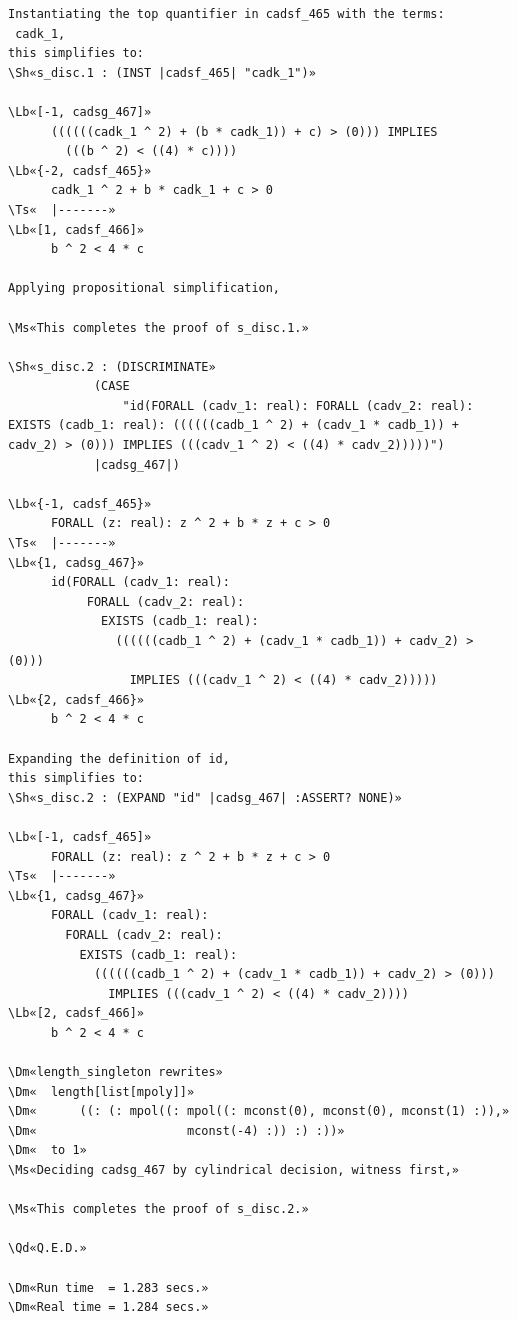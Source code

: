 \documentclass[11pt]{article}
\newcommand\Ms[1]{\textcolor{moss}{\textbf{#1}}}
\newcommand\Qd[1]{\colorbox{mosssoft}{\textcolor{moss}{\textbf{#1}}}}
\newcommand\Dm[1]{\textcolor{muted}{#1}}
\newcommand\Lb[1]{\textcolor{muted}{#1}}
\newcommand\Ts[1]{\textcolor{muted}{#1}}
\newcommand\Sh[1]{\textcolor{accent}{#1}}
\begin{document}
\begin{termbox}
\begin{Verbatim}[commandchars=\\«»]
Instantiating the top quantifier in cadsf_465 with the terms:
 cadk_1,
this simplifies to:
\Sh«s_disc.1 : (INST |cadsf_465| "cadk_1")»

\Lb«[-1, cadsg_467]»
      ((((((cadk_1 ^ 2) + (b * cadk_1)) + c) > (0))) IMPLIES
        (((b ^ 2) < ((4) * c))))
\Lb«{-2, cadsf_465}»
      cadk_1 ^ 2 + b * cadk_1 + c > 0
\Ts«  |-------»
\Lb«[1, cadsf_466]»
      b ^ 2 < 4 * c

Applying propositional simplification,

\Ms«This completes the proof of s_disc.1.»

\Sh«s_disc.2 : (DISCRIMINATE»
            (CASE
                "id(FORALL (cadv_1: real): FORALL (cadv_2: real): EXISTS (cadb_1: real): ((((((cadb_1 ^ 2) + (cadv_1 * cadb_1)) + cadv_2) > (0))) IMPLIES (((cadv_1 ^ 2) < ((4) * cadv_2)))))")
            |cadsg_467|)

\Lb«{-1, cadsf_465}»
      FORALL (z: real): z ^ 2 + b * z + c > 0
\Ts«  |-------»
\Lb«{1, cadsg_467}»
      id(FORALL (cadv_1: real):
           FORALL (cadv_2: real):
             EXISTS (cadb_1: real):
               ((((((cadb_1 ^ 2) + (cadv_1 * cadb_1)) + cadv_2) > (0)))
                 IMPLIES (((cadv_1 ^ 2) < ((4) * cadv_2)))))
\Lb«{2, cadsf_466}»
      b ^ 2 < 4 * c

Expanding the definition of id,
this simplifies to:
\Sh«s_disc.2 : (EXPAND "id" |cadsg_467| :ASSERT? NONE)»

\Lb«[-1, cadsf_465]»
      FORALL (z: real): z ^ 2 + b * z + c > 0
\Ts«  |-------»
\Lb«{1, cadsg_467}»
      FORALL (cadv_1: real):
        FORALL (cadv_2: real):
          EXISTS (cadb_1: real):
            ((((((cadb_1 ^ 2) + (cadv_1 * cadb_1)) + cadv_2) > (0)))
              IMPLIES (((cadv_1 ^ 2) < ((4) * cadv_2))))
\Lb«[2, cadsf_466]»
      b ^ 2 < 4 * c

\Dm«length_singleton rewrites»
\Dm«  length[list[mpoly]]»
\Dm«      ((: (: mpol((: mpol((: mconst(0), mconst(0), mconst(1) :)),»
\Dm«                     mconst(-4) :)) :) :))»
\Dm«  to 1»
\Ms«Deciding cadsg_467 by cylindrical decision, witness first,»

\Ms«This completes the proof of s_disc.2.»

\Qd«Q.E.D.»

\Dm«Run time  = 1.283 secs.»
\Dm«Real time = 1.284 secs.»
\end{Verbatim}
\end{termbox}
\end{document}
